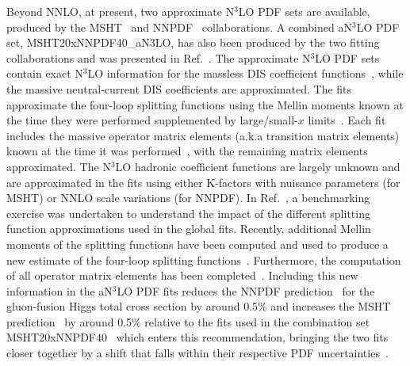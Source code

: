 Beyond  NNLO, at present, two approximate N$^3$LO PDF sets are available, produced by the MSHT~\cite{McGowan:2022nag} and NNPDF~\cite{NNPDF:2024nan} collaborations.
A combined aN$^3$LO PDF set, MSHT20xNNPDF40\_aN3LO, 
has also been produced by the two fitting collaborations and was presented in Ref.~\cite{Cridge:2024icl}.
The approximate N$^3$LO PDF sets contain exact N$^3$LO information for the massless DIS coefficient functions~\cite{Vermaseren:2005qc}, while the massive neutral-current DIS coefficients are approximated.
The fits approximate the four-loop splitting functions using the Mellin moments known at the time they were performed supplemented by large/small-$x$ limits~\cite{Davies:2016jie,Moch:2017uml,Moch:2018wjh,Moch:2021qrk,Falcioni:2023luc,Gehrmann:2023cqm,Gehrmann:2023iah,Falcioni:2023tzp,Moch:2023tdj,Falcioni:2024xyt,Falcioni:2023vqq,Falcioni:2024xav,Falcioni:2024qpd,Kniehl:2025ttz}. 
Each fit includes the massive operator matrix elements (a.k.a transition matrix elements) known at the time it was performed~\cite{Bierenbaum:2009mv,Kawamura:2012cr,Ablinger:2014uka,Ablinger:2014lka,Ablinger:2014vwa,Ablinger:2014nga,Ablinger:2014tla,Blumlein:2021enk,Ablinger:2022wbb,Ablinger:2023ahe,Ablinger:2024xtt}, with the remaining matrix elements approximated.
The N$^3$LO hadronic coefficient functions are largely unknown and are approximated in the fits using either K-factors with nuisance parameters (for MSHT) or NNLO scale variations (for NNPDF).
In Ref.~\cite{Cooper-Sarkar:2024crx}, a benchmarking exercise was undertaken to understand the impact of the different splitting function approximations used in the global fits.
Recently, additional Mellin moments of the splitting functions have been computed and used to produce a new estimate of the four-loop splitting functions~\cite{Falcioni:2024qpd}.
Furthermore, the computation of all operator matrix elements has been completed~\cite{Ablinger:2025nnq}.
Including this new information in the aN$^3$LO PDF fits reduces the NNPDF prediction~\cite{NNPDF:2024nan} for the gluon-fusion Higgs total cross section by around 0.5\% and increases the MSHT prediction~\cite{McGowan:2022nag} by around 0.5\% relative to the fits used in the combination set MSHT20xNNPDF40~\cite{Cridge:2024icl} which enters this recommendation, bringing the two fits closer together by a shift that falls within their respective PDF uncertainties~\cite{Thorne:2024npj,Hekhorn:2025xke}.


